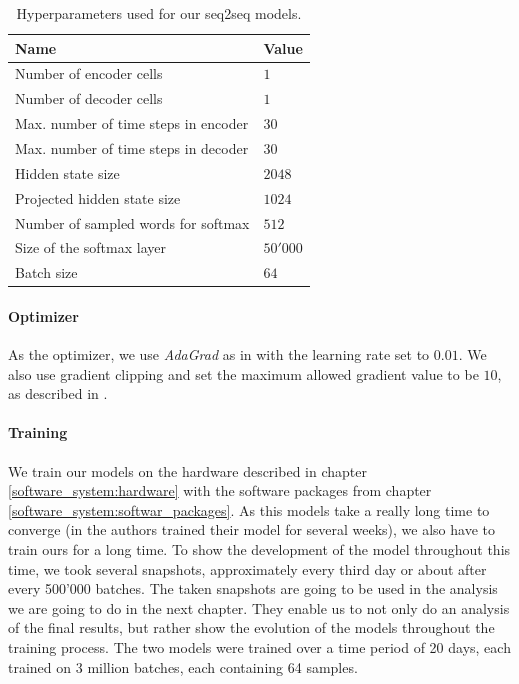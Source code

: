 \begin{table}[H]
	\centering
	\begin{adjustbox}{max width=\textwidth}
		\begin{tabular}{ll}
			\toprule
			Name & Value\\ \midrule
			Number of encoder cells & $1$\\
			Number of decoder cells & $1$\\
			Max. number of time steps in encoder & $30$\\
			Max. number of time steps in decoder & $30$\\
			Hidden state size & $2048$\\
			Projected hidden state size & $1024$\\
			Number of sampled words for softmax & $512$\\
			Size of the softmax layer & $50'000$\\
			Batch size & $64$\\
			\bottomrule
		\end{tabular}
	\end{adjustbox}
	\caption{Hyperparameters used for our seq2seq models.}
	\label{methods:hyperparameters:table}
\end{table}

\paragraph{Optimizer} As the optimizer, we use \emph{AdaGrad} \cite{Duchi:2011} as in \cite{Vinyals:2015} with the learning rate set to $0.01$. We also use gradient clipping and set the maximum allowed gradient value to be $10$, as described in \cite{Pascanu:2013}.

\paragraph{Training} We train our models on the hardware described in chapter \ref{software_system:hardware} with the software packages from chapter \ref{software_system:softwar_packages}. As this models take a really long time to converge (in \cite{Vinyals:2015} the authors trained their model for several weeks), we also have to train ours for a long time. To show the development of the model throughout this time, we took several snapshots, approximately every third day or about after every 500'000 batches. The taken snapshots are going to be used in the analysis we are going to do in the next chapter. They enable us to not only do an analysis of the final results, but rather show the evolution of the models throughout the training process. The two models were trained over a time period of 20 days, each trained on 3 million batches, each containing 64 samples.


